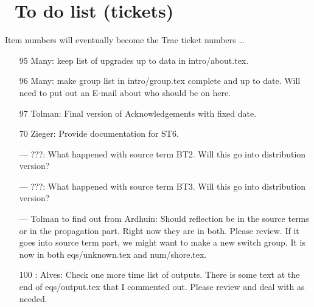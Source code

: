 \pagestyle{myheadings} \setcounter{page}{1} \setcounter{footnote}{0}

\section{~To do list (tickets)} \label{app:to_do}
\newcounters 
\vssub

\noindent
Item numbers will eventually become the Trac ticket numbers \ldots

\begin{itemize}

\item[95] Many: keep list of upgrades up to data in intro/about.tex.

\item[96] Many: make group list in intro/group.tex complete and up to
  date. Will need to put out an E-mail about who should be on here.

\item[97] Tolman: Final version of Acknowledgements with fixed date.




\item[70] Zieger: Provide documentation for ST6.

\item[---] ???: What happened with source term BT2. Will this go into
  distribution version?

\item[---] ???: What happened with source term BT3. Will this go into
  distribution version?

\item[---] Tolman to find out from Ardhuin: Should reflection be in the source
  terms or in the propagation part. Right now they are in both. Please
  review. If it goes into source term part, we might want to make a new switch
  group. It is now in both eqs/unknown.tex and num/shore.tex. 

\item[100]: Alves: Check one more time list of outputs. There is some text at
  the end of eqs/output.tex that I commented out. Please review and deal with
  as needed.


\end{itemize}
